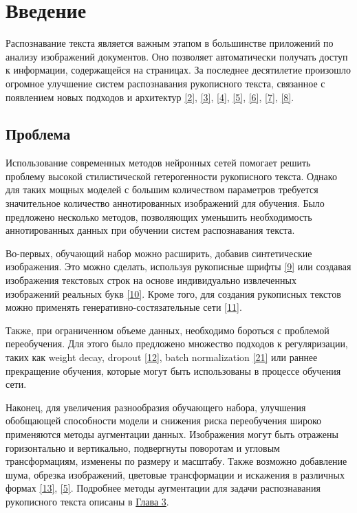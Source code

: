 \section{Введение}
\label{sec:Chapter0} 

Распознавание текста является важным этапом в большинстве приложений по анализу изображений документов. Оно позволяет автоматически получать доступ к информации, содержащейся на страницах. За последнее десятилетие произошло огромное улучшение систем распознавания рукописного текста, связанное с появлением новых подходов и архитектур \hyperlink{cite.Gra06}{[2]}, \hyperlink{cite.Vas17}{[3]}, \hyperlink{cite.Gra08}{[4]}, \hyperlink{cite.Bas14}{[5]}, \hyperlink{cite.Joa17}{[6]}, \hyperlink{cite.The17}{[7]}, \hyperlink{cite.Mas23}{[8]}.

\subsection{Проблема}

Использование современных методов нейронных сетей помогает решить проблему высокой стилистической гетерогенности рукописного текста. Однако для таких мощных моделей с большим количеством параметров требуется значительное количество аннотированных изображений для обучения. Было предложено несколько методов, позволяющих уменьшить необходимость аннотированных данных при обучении систем распознавания текста.

Во-первых, обучающий набор можно расширить, добавив синтетические изображения. Это можно сделать, используя рукописные шрифты \hyperlink{cite.Mur03}{[9]} или создавая изображения текстовых строк на основе индивидуально извлеченных изображений реальных букв \hyperlink{cite.She16}{[10]}. Кроме того, для создания рукописных текстов можно применять генеративно-состязательные сети \hyperlink{cite.Alo19}{[11]}. 

Также, при ограниченном объеме данных, необходимо бороться с проблемой переобучения. Для этого было предложено множество подходов к регуляризации, таких как weight decay, dropout \hyperlink{cite.Sut14}{[12]}, batch normalization \hyperlink{cite.Iof15}{[21]} или раннее прекращение обучения, которые могут быть использованы в процессе обучения сети.

Наконец, для увеличения разнообразия обучающего набора, улучшения обобщающей способности модели и снижения риска переобучения широко применяются методы аугментации данных. Изображения могут быть отражены горизонтально и вертикально, подвергнуты поворотам и угловым трансформациям, изменены по размеру и масштабу. Также возможно добавление шума, обрезка изображений, цветовые трансформации и искажения в различных формах \hyperlink{cite.Cur17}{[13]}, \hyperlink{cite.Bas14}{[5]}. Подробнее методы аугментации для задачи распознавания рукописного текста описаны в \hyperref[sec:Chapter2]{Глава 3}.

